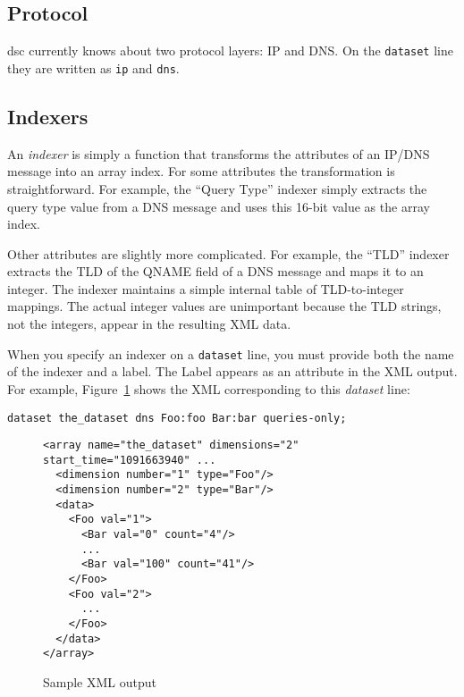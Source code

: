 \documentclass{report}
\def\dsc{{\sc dsc}}
\begin{document}
\subsection{Protocol}

{\dsc} currently knows about two protocol layers: IP and DNS.
On the {\tt dataset\/} line they are written as {\tt ip\/} and {\tt dns\/}.

\subsection{Indexers}

An {\em indexer\/} is simply a function that transforms the attributes
of an IP/DNS message into an array index.  For some attributes the
transformation is straightforward.  For example, the ``Query Type''
indexer simply extracts the query type value from a DNS message and
uses this 16-bit value as the array index.

Other attributes are slightly more complicated.  For example, the
``TLD'' indexer extracts the TLD of the QNAME field of a DNS message
and maps it to an integer.  The indexer maintains a simple internal
table of TLD-to-integer mappings.  The actual integer values are
unimportant because the TLD strings, not the integers, appear in
the resulting XML data.

When you specify an indexer on a {\tt dataset\/} line, you must
provide both the name of the indexer and a label.  The Label appears
as an attribute in the XML output.  For example,
Figure~\ref{fig-sample-xml} shows the XML corresponding to this
{\em dataset\/} line:

\begin{verbatim}
dataset the_dataset dns Foo:foo Bar:bar queries-only;
\end{verbatim}

\begin{figure}
\begin{small}\begin{verbatim}
<array name="the_dataset" dimensions="2" start_time="1091663940" ...
  <dimension number="1" type="Foo"/>
  <dimension number="2" type="Bar"/>
  <data>
    <Foo val="1">
      <Bar val="0" count="4"/>
      ...
      <Bar val="100" count="41"/>
    </Foo>
    <Foo val="2">
      ...
    </Foo>
  </data>
</array>
\end{verbatim}\end{small}
\label{fig-sample-xml}
\caption{Sample XML output}
\end{figure}
\end{document}
